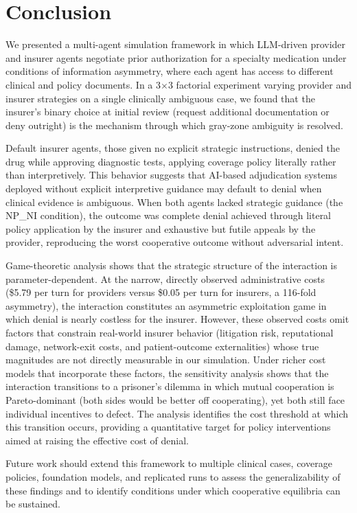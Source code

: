\section{Conclusion}
\label{sec:conclusion}

We presented a multi-agent simulation framework in which LLM-driven provider and insurer agents negotiate prior authorization for a specialty medication under conditions of information asymmetry, where each agent has access to different clinical and policy documents. In a 3$\times$3 factorial experiment varying provider and insurer strategies on a single clinically ambiguous case, we found that the insurer's binary choice at initial review (request additional documentation or deny outright) is the mechanism through which gray-zone ambiguity is resolved.

Default insurer agents, those given no explicit strategic instructions, denied the drug while approving diagnostic tests, applying coverage policy literally rather than interpretively. This behavior suggests that AI-based adjudication systems deployed without explicit interpretive guidance may default to denial when clinical evidence is ambiguous. When both agents lacked strategic guidance (the NP\_NI condition), the outcome was complete denial achieved through literal policy application by the insurer and exhaustive but futile appeals by the provider, reproducing the worst cooperative outcome without adversarial intent.

Game-theoretic analysis shows that the strategic structure of the interaction is parameter-dependent. At the narrow, directly observed administrative costs (\$5.79 per turn for providers versus \$0.05 per turn for insurers, a 116-fold asymmetry), the interaction constitutes an asymmetric exploitation game in which denial is nearly costless for the insurer. However, these observed costs omit factors that constrain real-world insurer behavior (litigation risk, reputational damage, network-exit costs, and patient-outcome externalities) whose true magnitudes are not directly measurable in our simulation. Under richer cost models that incorporate these factors, the sensitivity analysis shows that the interaction transitions to a prisoner's dilemma in which mutual cooperation is Pareto-dominant (both sides would be better off cooperating), yet both still face individual incentives to defect. The analysis identifies the cost threshold at which this transition occurs, providing a quantitative target for policy interventions aimed at raising the effective cost of denial.

Future work should extend this framework to multiple clinical cases, coverage policies, foundation models, and replicated runs to assess the generalizability of these findings and to identify conditions under which cooperative equilibria can be sustained.

